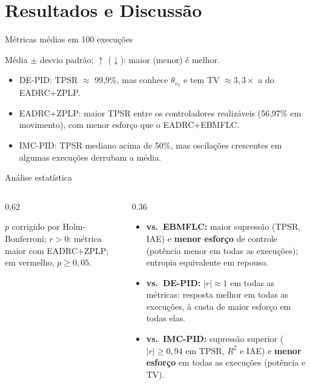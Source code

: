 \section{Resultados e Discussão}

\begin{frame}{Métricas médias em 100 execuções}
  \centering
  

  {\scriptsize Média $\pm$ desvio padrão; $\uparrow$ ($\downarrow$): maior (menor) é melhor.}

  \pause
  \begin{itemize}[<+->]
    \small
    \item DE-PID: TPSR $\approx$ 99,9\%, mas conhece $\theta_{v_3}$ e tem TV $\approx 3{,}3\times$ a do EADRC+ZPLP.
    \item EADRC+ZPLP: maior TPSR entre os controladores realizáveis (56,97\% em movimento), com menor esforço que o EADRC+EBMFLC.
    \item IMC-PID: TPSR mediano acima de 50\%, mas oscilações crescentes em algumas execuções derrubam a média.
  \end{itemize}
\end{frame}

\begin{frame}{Análise estatística}
  \begin{columns}[c]
    \begin{column}{0.62\textwidth}
      \centering
      

      \vspace{0.1cm}
      {\scriptsize $p$ corrigido por Holm-Bonferroni; $r > 0$: métrica maior com EADRC+ZPLP; em vermelho, $p \geq 0{,}05$.}
    \end{column}
    \pause
    \begin{column}{0.36\textwidth}
      \small
      \begin{itemize}[<+->]
        \setlength{\itemsep}{0.2cm}
        \item \textbf{vs.\ EBMFLC:} maior supressão (TPSR, IAE) e \textbf{menor esforço} de controle (potência menor em todas as execuções); entropia equivalente em repouso.
        \item \textbf{vs.\ DE-PID:} $|r| \approx 1$ em todas as métricas: resposta melhor em todas as execuções, à custa de maior esforço em todas elas.
        \item \textbf{vs.\ IMC-PID:} supressão superior ($|r| \geq 0{,}94$ em TPSR, $R^2$ e IAE) e \textbf{menor esforço} em todas as execuções (potência e TV).
      \end{itemize}
    \end{column}
  \end{columns}
\end{frame}

